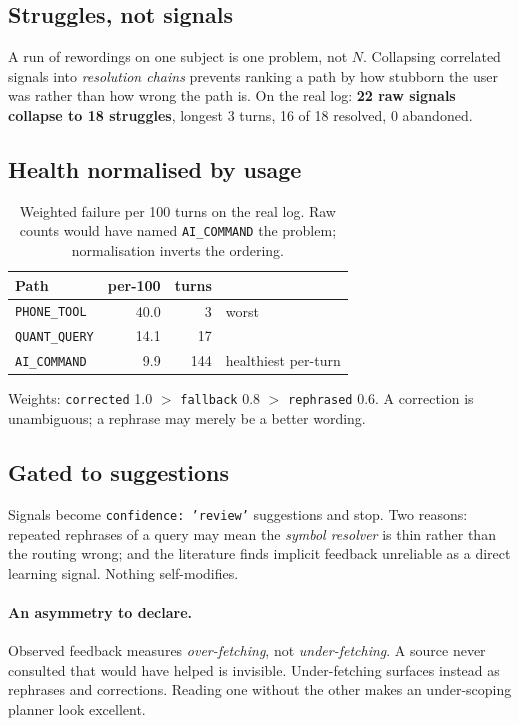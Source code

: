 \documentclass[10pt,twocolumn]{article}
\newcommand{\code}[1]{\texttt{\small #1}}
\begin{document}
\subsection{Struggles, not signals}

A run of rewordings on one subject is one problem, not $N$. Collapsing correlated signals
into \emph{resolution chains} prevents ranking a path by how stubborn the user was rather
than how wrong the path is. On the real log: \textbf{22 raw signals collapse to 18
struggles}, longest 3 turns, 16 of 18 resolved, 0 abandoned.

\subsection{Health normalised by usage}

\begin{table}[h]
\centering\small
\begin{tabular}{@{}lrrl@{}}
\toprule
\textbf{Path} & \textbf{per-100} & \textbf{turns} & \\
\midrule
\code{PHONE\_TOOL}  & 40.0 & 3   & worst \\
\code{QUANT\_QUERY} & 14.1 & 17  & \\
\code{AI\_COMMAND}  & 9.9  & 144 & healthiest per-turn \\
\bottomrule
\end{tabular}
\caption{Weighted failure per 100 turns on the real log. Raw counts would have named
\code{AI\_COMMAND} the problem; normalisation inverts the ordering.}
\end{table}

Weights: \code{corrected} 1.0 $>$ \code{fallback} 0.8 $>$ \code{rephrased} 0.6. A
correction is unambiguous; a rephrase may merely be a better wording.

\subsection{Gated to suggestions}

Signals become \code{confidence: 'review'} suggestions and stop. Two reasons: repeated
rephrases of a query may mean the \emph{symbol resolver} is thin rather than the routing
wrong; and the literature finds implicit feedback unreliable as a direct learning signal.
Nothing self-modifies.

\paragraph{An asymmetry to declare.} Observed feedback measures \emph{over-fetching}, not
\emph{under-fetching}. A source never consulted that would have helped is invisible.
Under-fetching surfaces instead as rephrases and corrections. Reading one without the
other makes an under-scoping planner look excellent.
\end{document}
